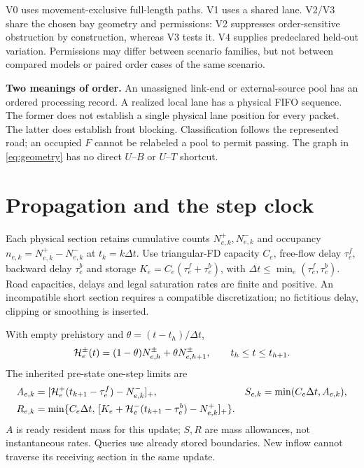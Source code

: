 \documentclass[10pt,a4paper]{article}
\newcommand{\pos}[1]{[#1]_+}
\begin{document}
V0 uses movement-exclusive full-length paths. V1 uses a shared lane.
V2/V3 share the chosen bay geometry and permissions: V2 suppresses
order-sensitive obstruction by construction, whereas V3 tests it.
V4 supplies predeclared held-out variation. Permissions may differ between
scenario families, but not between compared models or paired order cases
of the same scenario.

\textbf{Two meanings of order.}
An unassigned link-end or external-source pool has an ordered processing
record. A realized local lane has a physical FIFO sequence. The former
does not establish a single physical lane position for every packet.
The latter does establish front blocking. Classification follows the
represented road; an occupied $F$ cannot be relabeled a pool to permit
passing. The graph in \eqref{eq:geometry} has no direct $U$--$B$ or
$U$--$T$ shortcut.

\section{Propagation and the step clock}

Each physical section retains cumulative counts $N^+_{e,k},N^-_{e,k}$
and occupancy $n_{e,k}=N^+_{e,k}-N^-_{e,k}$ at $t_k=k\Delta t$.
Use triangular-FD capacity $C_e$, free-flow delay $\tau^f_e$, backward
delay $\tau^b_e$ and storage $K_e=C_e(\tau^f_e+\tau^b_e)$, with
$\Delta t\leq\min_e(\tau^f_e,\tau^b_e)$.
Road capacities, delays and legal saturation rates are finite and positive.
An incompatible short section requires a compatible discretization;
no fictitious delay, clipping or smoothing is inserted.

With empty prehistory and $\theta=(t-t_h)/\Delta t$,
\begin{equation}
 {\cal H}^{\pm}_e(t)
 =(1-\theta)N^\pm_{e,h}+\theta N^\pm_{e,h+1},
 \qquad t_h\leq t\leq t_{h+1}.
 \label{eq:history}
\end{equation}
The inherited pre-state one-step limits are
\begin{align}
 A_{e,k}&=\pos{{\cal H}^+_e(t_{k+1}-\tau^f_e)-N^-_{e,k}},
 &S_{e,k}&=\min(C_e\Delta t,A_{e,k}),\label{eq:sending}\\
 R_{e,k}&=\min\{C_e\Delta t,\,
 \pos{K_e+{\cal H}^-_e(t_{k+1}-\tau^b_e)-N^+_{e,k}}\}.
 \label{eq:receiving}
\end{align}
$A$ is ready resident mass for this update; $S,R$ are mass allowances,
not instantaneous rates. Queries use already stored boundaries.
New inflow cannot traverse its receiving section in the same update.
\end{document}
